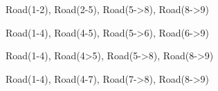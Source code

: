  Road(1-2), Road(2-5), Road(5->8), Road(8->9)
	\item[Route 3:] Road(1-4), Road(4-5), Road(5->6), Road(6->9)
	\item[Route 4:] Road(1-4), Road(4>5), Road(5->8), Road(8->9)
	\item[Route 5:] Road(1-4), Road(4-7), Road(7->8), Road(8->9)